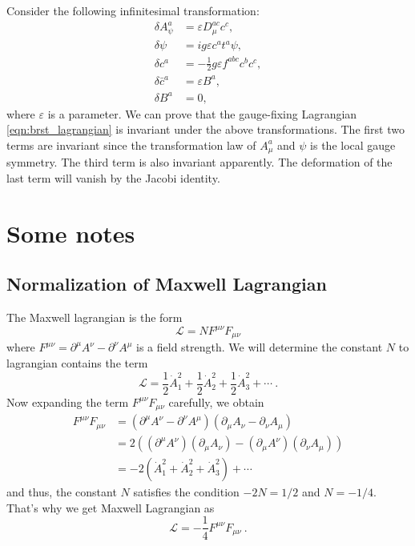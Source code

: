 \documentclass[a4paper,pdftex]{article}
\begin{document}
Consider the following infinitesimal transformation:
\begin{align}
  \delta A_{\psi}^{a}
  &=
  \varepsilon D_{\mu}^{ac}c^{c}
  ,
  \\
  \delta\psi
  &=
  ig\varepsilon c^{a}t^{a}\psi
  ,
  \\
  \delta c^{a}
  &=
  -
  \frac{1}{2}g\varepsilon f^{abc}c^{b}c^{c}
  ,
  \\
  \delta \bar{c}^{a}
  &=
  \varepsilon B^{a}
  ,
  \\
  \delta B^{a}
  &=
  0
  ,
\end{align}
where $\varepsilon$ is a parameter. We can prove that the gauge-fixing Lagrangian \eqref{eqn:brst_lagrangian} is invariant under the above transformations. The first two terms are invariant since the transformation law of $A_{\mu}^{a}$ and $\psi$ is the local gauge symmetry. The third term is also invariant apparently. The deformation of the last term will vanish by the Jacobi identity.

















\clearpage
\appendix
\section{Some notes}

\subsection{Normalization of Maxwell Lagrangian}

The Maxwell lagrangian is the form
\begin{equation}
  \mathcal{L}
  =
  NF^{\mu\nu}F_{\mu\nu}
\end{equation}
where $F^{\mu\nu}=\partial^{\mu}A^{\nu}-\partial^{\nu}A^{\mu}$ is a field strength. We will determine the constant $N$ to lagrangian contains the term 
\begin{equation}
  \mathcal{L}
  =
  \frac{1}{2}\dot{A}_{1}^2
  +
  \frac{1}{2}\dot{A}_{2}^2
  +
  \frac{1}{2}\dot{A}_{3}^2
  +
  \cdots
  \ .
\end{equation}
Now expanding the term $F^{\mu\nu}F_{\mu\nu}$ carefully, we obtain
\begin{align}
  F^{\mu\nu}F_{\mu\nu}
  &=
  (\partial^{\mu}A^{\nu}-\partial^{\nu}A^{\mu})
  (\partial_{\mu}A_{\nu}-\partial_{\nu}A_{\mu})
  \nonumber
  \\
  &=
  2((\partial^{\mu}A^{\nu})(\partial_{\mu}A_{\nu})-(\partial_{\mu}A^{\nu})(\partial_{\nu}A_{\mu}))
  \nonumber
  \\
  &=
  -2(\dot{A}_{1}^2+\dot{A}_{2}^2+\dot{A}_{3}^2)+\cdots
\end{align}
and thus, the constant $N$ satisfies the condition $-2N=1/2$ and $N=-1/4$. That's why we get Maxwell Lagrangian as
\begin{equation}
  \mathcal{L}
  =
  -\frac{1}{4}F^{\mu\nu}F_{\mu\nu}
  \ .
\end{equation}



\clearpage



\nocite{Peskin_IntroductionQuantum_1995}
\nocite{Wess_SupersymmetrySupergravity_1992}
\end{document}
